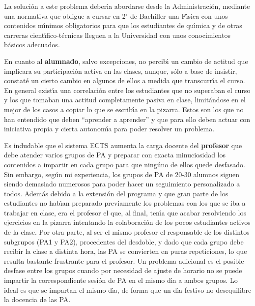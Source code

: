 La soluci\'{o}n a este problema deber\'{\i}a abordarse desde la 
Administraci\'{o}n, mediante una normativa que  obligue a cursar
en   2{$^\circ$} de Bachiller  una F\'{\i}sica con unos contenidos
m\'{\i}nimos  obligatorios para que los estudiantes de  qu\'{\i}mica y de 
otras carreras cient\'{\i}fico-t\'{e}cnicas lleguen a la Universidad
con unos conocimientos b\'{a}sicos adecuados.



En cuanto al {\bf  alumnado}, salvo excepciones, no  percib\'{\i}
un cambio de actitud que implicara su participaci\'{o}n activa en las clases,
 aunque, s\'{o}lo a base
de insistir, constat\'{e}  un cierto  cambio en  algunos de ellos
 a medida que transcurr\'{\i}a el  curso.
 En general exist\'{\i}a una  correlaci\'{o}n entre
los estudiantes que no superaban el curso y los que tomaban
una actitud completamente pasiva en clase, limit\'{a}ndose en el 
mejor de los casos a copiar lo que se escrib\'{\i}a en la pizarra.
Estos son  los que no han entendido que deben ``aprender a aprender''
y que para ello deben actuar con  iniciativa propia
 y cierta autonom\'{\i}a para poder resolver
un problema.

Es indudable que el sistema ECTS aumenta la carga docente del {\bf  profesor}
que debe atender varios grupos de PA y 
preparar con exacta  minuciosidad los contenidos a impartir en cada grupo
 para que ning\'{u}no de ellos  quede desfasado.
Sin embargo, seg\'{u}n mi experiencia, los grupos de PA de 20-30 alumnos
siguen siendo demasiado numerosos para poder hacer un seguimiento
personalizado a todos.
 Adem\'{a}s
debido a la extensi\'{o}n del programa y que gran parte de los estudiantes
no hab\'{\i}an preparado previamente los problemas con los que se iba a trabajar
en clase, era el profesor el que, al final, ten\'{\i}a que acabar
 resolviendo los ejercicios en la pizarra intentando la
 colaboraci\'{o}n de los pocos estudiantes activos de la clase.
Por otra parte, al ser el mismo profesor el responsable de los distintos
subgrupos (PA1 y PA2), procedentes del desdoble, y dado que cada grupo
debe recibir la clase a distinta hora, las PA se convierten  en puras 
repeticiones, lo que resulta  bastante frustrante para el profesor.
Un problema adicional es el posible desfase entre los grupos cuando por 
necesidad de ajuste de horario no se puede impartir la correspondiente 
sesi\'{o}n de PA en el mismo d\'{\i}a a ambos grupos.
Lo ideal es que se impartan el mismo d\'{\i}a, de forma que un d\'{\i}a festivo
no desequilibre la docencia de las PA.

